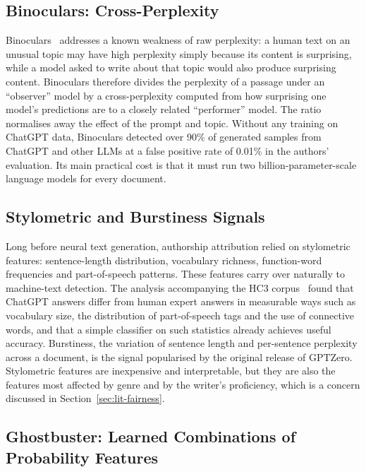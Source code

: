 \subsection{Binoculars: Cross-Perplexity}

Binoculars~\cite{hans2024binoculars} addresses a known weakness of raw
perplexity: a human text on an unusual topic may have high perplexity simply
because its content is surprising, while a model asked to write about that
topic would also produce surprising content. Binoculars therefore divides the
perplexity of a passage under an ``observer'' model by a cross-perplexity
computed from how surprising one model's predictions are to a closely related
``performer'' model. The ratio normalises away the effect of the prompt and
topic. Without any training on ChatGPT data, Binoculars detected over 90\% of
generated samples from ChatGPT and other LLMs at a false positive rate of
0.01\% in the authors' evaluation. Its main practical cost is that it must
run two billion-parameter-scale language models for every document.

\subsection{Stylometric and Burstiness Signals}

Long before neural text generation, authorship attribution relied on
stylometric features: sentence-length distribution, vocabulary richness,
function-word frequencies and part-of-speech patterns. These features carry
over naturally to machine-text detection. The analysis accompanying the HC3
corpus~\cite{guo2023hc3} found that ChatGPT answers differ from human expert
answers in measurable ways such as vocabulary size, the distribution of
part-of-speech tags and the use of connective words, and that a simple
classifier on such statistics already achieves useful accuracy. Burstiness,
the variation of sentence length and per-sentence perplexity across a
document, is the signal popularised by the original release of GPTZero.
Stylometric features are inexpensive and interpretable, but they are also
the features most affected by genre and by the writer's proficiency, which
is a concern discussed in Section~\ref{sec:lit-fairness}.

\subsection{Ghostbuster: Learned Combinations of Probability Features}

